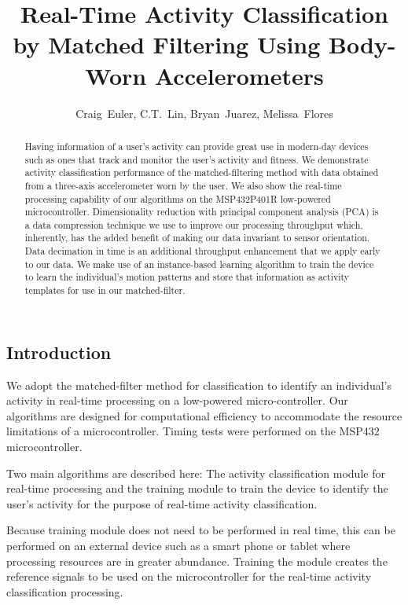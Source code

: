 \documentclass{sciposter}
\title{{\fontsize{100}{120}\selectfont Real-Time Activity Classification by Matched Filtering Using Body-Worn Accelerometers}}
\author{Craig~Euler, C.T.~Lin, Bryan~Juarez, Melissa~Flores}
\institute 
{College of Engineering and Computer Science\\
California State University Northridge}
\begin{document}

\maketitle

\begin{multicols}{3}

\begin{abstract}
Having information of a user's activity can provide great use in modern-day devices such as ones that track and monitor the user's activity and fitness.
We demonstrate activity classification performance of the matched-filtering method with data obtained from a three-axis accelerometer worn by the user.
We also show the real-time processing capability of our algorithms on the MSP432P401R low-powered microcontroller.
Dimensionality reduction with principal component analysis (PCA) \cite{bishop_2006} is a data compression technique we use to improve our processing throughput which, inherently, has the added benefit of making     our data invariant to sensor orientation.
Data decimation in time is an additional throughput enhancement that we apply early to our data.
We make use of an instance-based learning algorithm to train the device to learn the individual's motion patterns and store that information as activity templates for use in our matched-filter.
\end{abstract}

\section{Introduction}
We adopt the matched-filter method for classification to identify an individual's activity in real-time processing on a low-powered micro-controller.
Our algorithms are designed for computational efficiency to accommodate the resource limitations of a microcontroller.
Timing tests were performed on the MSP432 microcontroller.

Two main algorithms are described here: The activity classification module for real-time processing and the training module to train the device to identify the user's activity for the purpose of real-time activity classification.

Because training module does not need to be performed in real time, this can be performed on an external device such as a smart phone or tablet where processing resources are in greater abundance.
Training the module creates the reference signals to be used on the microcontroller for the real-time activity classification processing.


\end{multicols}
\end{document}
